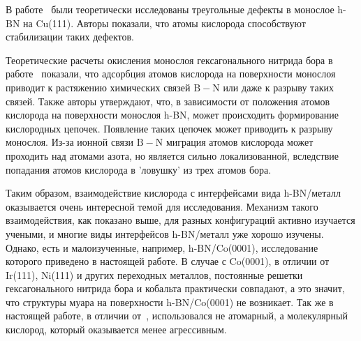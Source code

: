 В работе~\cite{Huber2015_Oxy_Stab_defffects_in_hBN} были теоретически 
исследованы треугольные дефекты в монослое h-BN на Cu(111). Авторы показали, 
что атомы кислорода способствуют стабилизации таких дефектов. 


Теоретические расчеты окисления монослоя гексагонального нитрида бора
в работе~\cite{Zhao2012} показали, что адсорбция атомов кислорода на 
поверхности монослоя приводит к растяжению химических связей $\mathrm{B-N}$ или
даже к разрыву таких связей. Также авторы утверждают, что, в зависимости
от положения атомов кислорода на поверхности монослоя h-BN, может происходить
формирование кислородных цепочек. Появление таких цепочек может приводить
к разрыву монослоя. Из-за ионной связи $\mathrm{B-N}$ миграция
атомов кислорода может проходить над атомами азота, но является сильно
локализованной, вследствие попадания атомов кислорода в 'ловушку' из трех
атомов бора. 


Таким образом, взаимодействие кислорода с интерфейсами вида h-BN/металл 
оказывается очень интересной темой для исследования. Механизм такого
взаимодействия, как показано выше, для разных конфигураций активно изучается 
учеными, и многие виды интерфейсов h-BN/металл уже хорошо изучены.
Однако, есть и малоизученные, например, h-BN/Co(0001), исследование которого
приведено в настоящей работе. В случае с Co(0001), в отличии от Ir(111),
Ni(111) и других переходных металлов, постоянные решетки гексагонального
нитрида бора и кобальта практически совпадают, а это значит, что структуры 
муара на поверхности h-BN/Co(0001) не возникает. Так же в настоящей работе, в 
отличии от~\cite{Simonov2012_h-BN/Ir_Oxydation}, использовался не атомарный, а 
молекулярный кислород, который оказывается менее агрессивным. 















